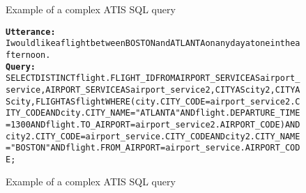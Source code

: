 \begin{figure}[H]
    \label{tab:ATIS}
    \begin{AIbox}{Example of a complex ATIS SQL query}
        \vspace{-5px}
        \parbox{1\textwidth}{\scriptsize
        \begin{alltt} 
            {\bf Utterance:} \\ 
            I would like a flight between BOSTON and ATLANTA on any day at one in the afternoon. 
            \\
            {\bf Query:} \\
            SELECT DISTINCT flight.FLIGHT\_ID FROM AIRPORT\_SERVICE AS airport\_service , AIRPORT\_SERVICE AS airport\_service2 , CITY AS city2 , CITY AS city , FLIGHT AS flight WHERE ( city.CITY\_CODE = airport\_service2.CITY\_CODE AND city.CITY\_NAME = "ATLANTA" AND flight.DEPARTURE\_TIME = 1300 AND flight.TO\_AIRPORT = airport\_service2.AIRPORT\_CODE ) AND city2.CITY\_CODE = airport\_service.CITY\_CODE AND city2.CITY\_NAME = "BOSTON" AND flight.FROM\_AIRPORT = airport\_service.AIRPORT\_CODE ;
        \end{alltt}
        }
        \vspace{-5px}
    \end{AIbox}
    \caption{Example of a complex ATIS SQL query}
\end{figure}